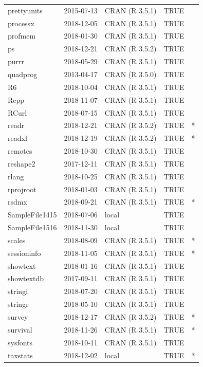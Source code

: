 \documentclass{grattan}\usepackage[]{graphicx}\usepackage[]{color}
\begin{document}
\begin{longtable}{lllll}
  prettyunits & 2015-07-13 & CRAN (R 3.5.1) & TRUE &  \\ 
  processx & 2018-12-05 & CRAN (R 3.5.1) & TRUE &  \\ 
  profmem & 2018-01-30 & CRAN (R 3.5.1) & TRUE &  \\ 
  ps & 2018-12-21 & CRAN (R 3.5.2) & TRUE &  \\ 
  purrr & 2018-05-29 & CRAN (R 3.5.1) & TRUE &  \\ 
  quadprog & 2013-04-17 & CRAN (R 3.5.0) & TRUE &  \\ 
  R6 & 2018-10-04 & CRAN (R 3.5.1) & TRUE &  \\ 
  Rcpp & 2018-11-07 & CRAN (R 3.5.1) & TRUE &  \\ 
  RCurl & 2018-07-15 & CRAN (R 3.5.1) & TRUE &  \\ 
  readr & 2018-12-21 & CRAN (R 3.5.2) & TRUE & * \\ 
  readxl & 2018-12-19 & CRAN (R 3.5.2) & TRUE & * \\ 
  remotes & 2018-10-30 & CRAN (R 3.5.1) & TRUE &  \\ 
  reshape2 & 2017-12-11 & CRAN (R 3.5.1) & TRUE &  \\ 
  rlang & 2018-10-25 & CRAN (R 3.5.1) & TRUE &  \\ 
  rprojroot & 2018-01-03 & CRAN (R 3.5.1) & TRUE &  \\ 
  rsdmx & 2018-09-21 & CRAN (R 3.5.1) & TRUE & * \\ 
  SampleFile1415 & 2018-07-06 & local & TRUE &  \\ 
  SampleFile1516 & 2018-11-30 & local & TRUE &  \\ 
  scales & 2018-08-09 & CRAN (R 3.5.1) & TRUE & * \\ 
  sessioninfo & 2018-11-05 & CRAN (R 3.5.1) & TRUE & * \\ 
  showtext & 2018-01-16 & CRAN (R 3.5.1) & TRUE &  \\ 
  showtextdb & 2017-09-11 & CRAN (R 3.5.1) & TRUE &  \\ 
  stringi & 2018-07-20 & CRAN (R 3.5.1) & TRUE &  \\ 
  stringr & 2018-05-10 & CRAN (R 3.5.1) & TRUE &  \\ 
  survey & 2018-12-17 & CRAN (R 3.5.2) & TRUE & * \\ 
  survival & 2018-11-26 & CRAN (R 3.5.1) & TRUE & * \\ 
  sysfonts & 2018-10-11 & CRAN (R 3.5.1) & TRUE &  \\ 
  taxstats & 2018-12-02 & local & TRUE & * \\ 

\end{longtable}
\end{document}
